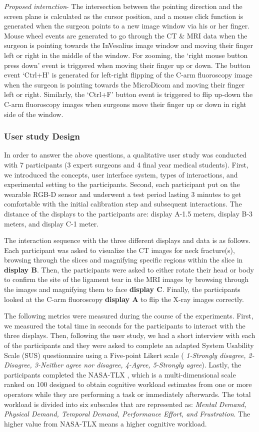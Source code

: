 {\textit{Proposed interaction}- The intersection between the pointing direction and the screen plane is calculated as the cursor position, and a mouse click function is generated when the surgeon points to a new image window via his or her finger. Mouse wheel events are generated to go through the CT \& MRI data when the surgeon is pointing towards the InVesalius image window and moving their finger left or right in the middle of the window. For zooming, the `right mouse button press down' event is triggered when moving their finger up or down. The button event `Ctrl+H' is generated for left-right flipping of the C-arm fluoroscopy image when the surgeon is pointing towards the MicroDicom and moving their finger left or right. Similarly, the `Ctrl+F' button event is triggered to flip up-down the C-arm fluoroscopy images when surgeons move their finger up or down in right side of the window.
\subsubsection{User study Design}
In order to answer the above questions, a qualitative user study was conducted with 7 participants (3 expert surgeons and 4 final year medical students). First, we introduced the concepts, user interface system, types of interactions, and experimental setting to the participants. Second, each participant put on the wearable RGB-D sensor and underwent a test period lasting 3 minutes to get comfortable with the initial calibration step and subsequent interactions. The distance of the displays to the participants are: display A-1.5 meters, display B-3 meters, and display C-1 meter.

The interaction sequence with the three different displays and data is as follows. Each participant was asked to visualize the CT images for neck fracture(s), browsing through the slices and magnifying specific regions within the slice in \textbf{display B}. Then, the participants were asked to either rotate their head or body to confirm the site of the ligament tear in the MRI images by browsing through the images and magnifying them to face \textbf{display C}. Finally, the participants looked at the C-arm fluoroscopy \textbf{display A} to flip the X-ray images correctly.

The following metrics were measured during the course of the experiments. First, we measured the total time in seconds for the participants to interact with the three displays. Then, following the user study, we had a short interview with each of the participants and they were asked to complete an adapted System Usability Scale (SUS) \cite{Brooke1996} questionnaire using a Five-point Likert scale (\textit{ 1-Strongly disagree, 2-Disagree, 3-Neither agree nor disagree, 4-Agree, 5-Strongly agree}). Lastly, the participants completed the NASA-TLX \cite{Hart2006}, which is a multi-dimensional scale ranked on 100 designed to obtain cognitive workload estimates from one or more operators while they are performing a task or immediately afterwards. The total workload is divided into six subscales that are represented as: \textit{Mental Demand, Physical Demand, Temporal Demand, Performance Effort, and Frustration}. The higher value from NASA-TLX means a higher cognitive workload.
}
